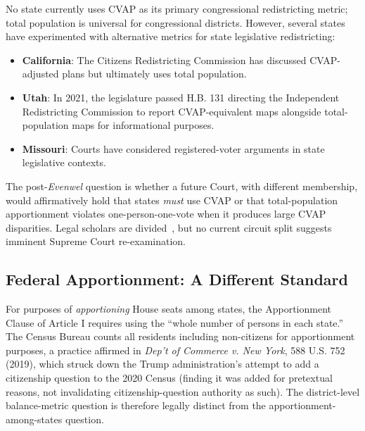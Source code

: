 No state currently uses CVAP as its primary congressional redistricting metric; total population is universal for congressional districts. However, several states have experimented with alternative metrics for state legislative redistricting:

\begin{itemize}
    \item \textbf{California}: The Citizens Redistricting Commission has discussed CVAP-adjusted plans but ultimately uses total population.
    \item \textbf{Utah}: In 2021, the legislature passed H.B. 131 directing the Independent Redistricting Commission to report CVAP-equivalent maps alongside total-population maps for informational purposes.
    \item \textbf{Missouri}: Courts have considered registered-voter arguments in state legislative contexts.
\end{itemize}

The post-\emph{Evenwel} question is whether a future Court, with different membership, would affirmatively hold that states \emph{must} use CVAP or that total-population apportionment violates one-person-one-vote when it produces large CVAP disparities. Legal scholars are divided~\citep{scharff2016evenwel, ban2016counting}, but no current circuit split suggests imminent Supreme Court re-examination.

\subsection{Federal Apportionment: A Different Standard}

For purposes of \emph{apportioning} House seats among states, the Apportionment Clause of Article I requires using the ``whole number of persons in each state.'' The Census Bureau counts all residents including non-citizens for apportionment purposes, a practice affirmed in \emph{Dep't of Commerce v. New York}, 588 U.S. 752 (2019), which struck down the Trump administration's attempt to add a citizenship question to the 2020 Census (finding it was added for pretextual reasons, not invalidating citizenship-question authority as such). The district-level balance-metric question is therefore legally distinct from the apportionment-among-states question.
